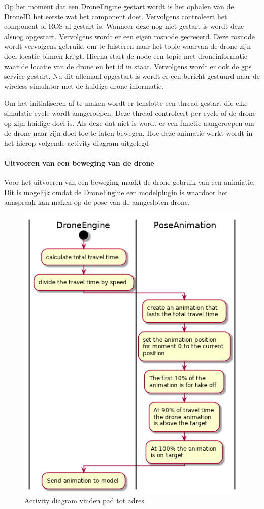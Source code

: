 \documentclass[a4paper, 11pt, oneside]{report}
\begin{document}
Op het moment dat een DroneEngine gestart wordt is het ophalen van de DroneID  het eerste wat het component doet.
Vervolgens controleert het component of ROS al gestart is.
Wanneer deze nog niet gestart is wordt deze alsnog opgestart.
Vervolgens wordt er een eigen rosnode gecreëerd.
Deze rosnode wordt vervolgens gebruikt om te luisteren naar het topic waarvan de drone zijn doel locatie binnen krijgt.
Hierna start de node een topic met droneinformatie waar de locatie van de drone en het id in staat.
Vervolgens wordt er ook de gps service gestart.
Nu dit allemaal opgestart is wordt er een bericht gestuurd naar de wireless simulator met de huidige drone informatie.

Om het initialiseren af te maken wordt er tenslotte een thread gestart die elke simulatie cycle wordt aangeroepen.
Deze thread controleert per cycle of de drone op zijn huidige doel is.
Als deze dat niet is wordt er een functie aangeroepen om de drone naar zijn doel toe te laten bewegen.
Hoe deze animatie werkt wordt in het hierop volgende activity diagram uitgelegd   


\paragraph{Uitvoeren van een beweging van de drone}
\label{DetailedDesign:MeshNetwerk:Activity:AnimatieDrone}
Voor het uitvoeren van een beweging maakt de drone gebruik van een animiatie. 
Dit is mogelijk omdat de DroneEngine een modelplugin is waardoor het aanspraak kan maken op de pose van de aangesloten drone.
  

\begin{figure}[H]
	\begin{center}\includegraphics[width=.45\linewidth]{UML/out/DroneSimulation/Activity/DroneMovement/DroneMovement.png}\end{center}
	\caption{Activity diagram vinden pad tot adres}
	\label{fig:communication:MeshNetwerk:Activity:AnimatieDrone}
\end{figure}
\end{document}
